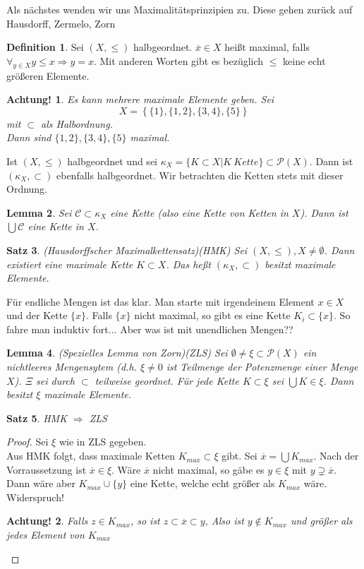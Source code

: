 \documentclass[12pt,a4paper]{article}
\newtheorem{theorem}{Satz}
\newtheorem{lemma}[theorem]{Lemma}
\newtheorem*{attention}{Achtung!}
\theoremstyle{definition}
\newtheorem{definition}[theorem]{Definition}
\theoremstyle{remark}
\renewcommand{\bar}[1]{\overline{#1}}
\begin{document}
		Als nächstes wenden wir uns Maximalitätsprinzipien zu. Diese gehen zurück auf Hausdorff, Zermelo, Zorn
		\begin{definition}
			Sei $(X, \leq)$ halbgeordnet. $\bar{x} \in X$ heißt maximal, falls $\forall_{y \in X} y \leq x \Rightarrow y = x$. Mit anderen Worten gibt es bezüglich $\leq$ keine echt größeren Elemente.
		\end{definition}
		\begin{attention}
			Es kann mehrere maximale Elemente geben. Sei
			\begin{equation}
				X = \left\{ \{ 1\}, \{ 1,2 \}, \{ 3,4 \}, \{ 5 \} \right\}
			\end{equation}
			mit $\subset$ als Halbordnung. \\
			Dann sind $\{ 1,2 \}, \{ 3,4 \}, \{ 5 \}$ maximal.
		\end{attention}
		Ist $(X, \leq)$ halbgeordnet und sei $\kappa_X = \{ K \subset X | K \ Kette \} \subset \mathcal{P}(X)$. Dann ist $(\kappa_X, \subset)$ ebenfalls halbgeordnet. Wir betrachten die Ketten stets mit dieser Ordnung.
		\begin{lemma}
			Sei $\mathcal{C} \subset \kappa_X$ eine Kette (also eine Kette von Ketten in $X$). Dann ist $\bigcup \mathcal{C}$ eine Kette in $X$.
		\end{lemma}
		\begin{theorem}{(Hausdorffscher Maximalkettensatz)(HMK)}
			Sei $(X, \leq), X \neq \emptyset$. Dann existiert eine maximale Kette $K \subset X$. Das heßt $(\kappa_X, \subset)$ besitzt maximale Elemente.
		\end{theorem}
		Für endliche Mengen ist das klar. Man starte mit irgendeinem Element $x \in X$ und der Kette $\{ x \}$. Falls $\{ x \}$ nicht maximal, so gibt es eine Kette $K_i \subset \{ x \}$. So fahre man induktiv fort... Aber was ist mit unendlichen Mengen?? 
		\begin{lemma}{(Spezielles Lemma von Zorn)(ZLS)}
			Sei $\emptyset \neq \xi \subset \mathcal{P}(X)$ ein nichtleeres Mengensytem (d.h. $\xi \neq 0$ ist Teilmenge der Potenzmenge einer Menge $X$). $\Xi$ sei durch $\subset$ teilweise geordnet. Für jede Kette $K \subset \xi$ sei $\bigcup K \in \xi$. Dann besitzt $\xi$ maximale Elemente.
		\end{lemma}
		\begin{theorem}
			HMK $\Rightarrow$ ZLS
		\end{theorem}
		\begin{proof}
			Sei $\xi$ wie in ZLS gegeben. \\
			Aus HMK folgt, dass maximale Ketten $K_{max} \subset \xi$ gibt. Sei $\bar{x}= \bigcup K_{max}$. Nach der Vorraussetzung ist $\bar{x} \in \xi$. Wäre $\bar{x}$ nicht maximal, so gäbe es $y \in \xi$ mit $y \supsetneq \bar{x}$. Dann wäre aber $K_{max} \cup \{ y\}$ eine Kette, welche echt größer als $K_{max}$ wäre. Widerspruch!
			\begin{attention}
				Falls $z \in K_{max}$, so ist $z \subset \bar{x} \subset y$, Also ist $y \notin K_{max}$ und größer als jedes Element von $K_{max}$
			\end{attention}
		\end{proof}
\end{document}

